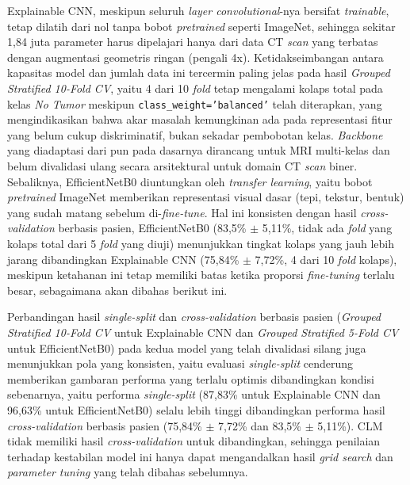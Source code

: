 Explainable CNN, meskipun seluruh \textit{layer convolutional}-nya bersifat \textit{trainable}, tetap dilatih dari nol tanpa bobot \textit{pretrained} seperti ImageNet, sehingga sekitar 1,84 juta parameter harus dipelajari hanya dari data CT \textit{scan} yang terbatas dengan augmentasi geometris ringan (pengali 4x). Ketidakseimbangan antara kapasitas model dan jumlah data ini tercermin paling jelas pada hasil \textit{Grouped Stratified 10-Fold CV}, yaitu 4 dari 10 \textit{fold} tetap mengalami kolaps total pada kelas \textit{No Tumor} meskipun \texttt{class\_weight='balanced'} telah diterapkan, yang mengindikasikan bahwa akar masalah kemungkinan ada pada representasi fitur yang belum cukup diskriminatif, bukan sekadar pembobotan kelas. \textit{Backbone} yang diadaptasi dari \cite{iftikhar2025explainable} pun pada dasarnya dirancang untuk MRI multi-kelas dan belum divalidasi ulang secara arsitektural untuk domain CT \textit{scan} biner. Sebaliknya, EfficientNetB0 diuntungkan oleh \textit{transfer learning}, yaitu bobot \textit{pretrained} ImageNet memberikan representasi visual dasar (tepi, tekstur, bentuk) yang sudah matang sebelum di-\textit{fine-tune}. Hal ini konsisten dengan hasil \textit{cross-validation} berbasis pasien, EfficientNetB0 (83,5\% $\pm$ 5,11\%, tidak ada \textit{fold} yang kolaps total dari 5 \textit{fold} yang diuji) menunjukkan tingkat kolaps yang jauh lebih jarang dibandingkan Explainable CNN (75,84\% $\pm$ 7,72\%, 4 dari 10 \textit{fold} kolaps), meskipun ketahanan ini tetap memiliki batas ketika proporsi \textit{fine-tuning} terlalu besar, sebagaimana akan dibahas berikut ini.

Perbandingan hasil \textit{single-split} dan \textit{cross-validation} berbasis pasien (\textit{Grouped Stratified 10-Fold CV} untuk Explainable CNN dan \textit{Grouped Stratified 5-Fold CV} untuk EfficientNetB0) pada kedua model yang telah divalidasi silang juga menunjukkan pola yang konsisten, yaitu evaluasi \textit{single-split} cenderung memberikan gambaran performa yang terlalu optimis dibandingkan kondisi sebenarnya, yaitu performa \textit{single-split} (87,83\% untuk Explainable CNN dan 96,63\% untuk EfficientNetB0) selalu lebih tinggi dibandingkan performa hasil \textit{cross-validation} berbasis pasien (75,84\% $\pm$ 7,72\% dan 83,5\% $\pm$ 5,11\%). CLM tidak memiliki hasil \textit{cross-validation} untuk dibandingkan, sehingga penilaian terhadap kestabilan model ini hanya dapat mengandalkan hasil \textit{grid search} dan \textit{parameter tuning} yang telah dibahas sebelumnya.

